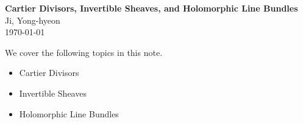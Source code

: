 \documentclass[11pt,openany]{article}
\renewcommand{\vec}[1]{\mathbf{#1}}
\renewcommand{\d}{\mathrm{d}} %
\begin{document}
\begin{center}
	\huge\textbf{Cartier Divisors, Invertible Sheaves, and Holomorphic Line Bundles}\\
	\vspace{0.5em}
	\large{Ji, Yong-hyeon}\\
	\vspace{0.5em}
	\normalsize{\today}\\
\end{center} 
\noindent 
We cover the following topics in this note.
\begin{itemize}
	\item Cartier Divisors
	\item Invertible Sheaves
	\item Holomorphic Line Bundles
\end{itemize}
%
%
\end{document}
